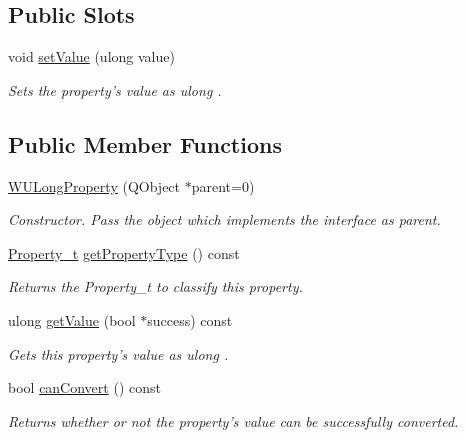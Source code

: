 \subsection*{Public Slots}
\begin{DoxyCompactItemize}
\item 
void \hyperlink{class_w_u_long_property_a9536e4c79e6a9aa6536b6c3e26638bea}{set\-Value} (ulong value)
\begin{DoxyCompactList}\small\item\em Sets the property's value as ulong . \end{DoxyCompactList}\end{DoxyCompactItemize}
\subsection*{Public Member Functions}
\begin{DoxyCompactItemize}
\item 
\hyperlink{class_w_u_long_property_ab2e17ffa240a20e21098ad95ba202260}{W\-U\-Long\-Property} (Q\-Object $\ast$parent=0)
\begin{DoxyCompactList}\small\item\em Constructor. Pass the object which implements the interface as parent. \end{DoxyCompactList}\item 
\hyperlink{group___property_classes_ga38f1ccddda12c7cb50b868c9f789ee37}{Property\-\_\-t} \hyperlink{class_w_u_long_property_a1540e17406836973ff4ffedc7ea7d294}{get\-Property\-Type} () const 
\begin{DoxyCompactList}\small\item\em Returns the Property\-\_\-t to classify this property. \end{DoxyCompactList}\item 
ulong \hyperlink{class_w_u_long_property_a58823102ac77872b7700b0e4347cac28}{get\-Value} (bool $\ast$success) const 
\begin{DoxyCompactList}\small\item\em Gets this property's value as ulong . \end{DoxyCompactList}\item 
bool \hyperlink{class_w_u_long_property_add1989192edb81ac284a6680cf9f32dd}{can\-Convert} () const 
\begin{DoxyCompactList}\small\item\em Returns whether or not the property's value can be successfully converted. \end{DoxyCompactList}\end{DoxyCompactItemize}
